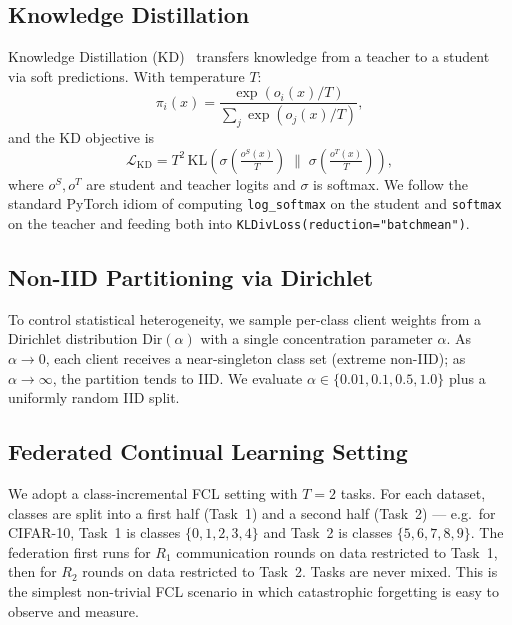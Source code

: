 \documentclass[journal]{IEEEtran}
\begin{document}
\subsection{Knowledge Distillation}

Knowledge Distillation (KD)~\cite{hinton_kd} transfers knowledge from a
teacher to a student via soft predictions. With temperature $T$:
\begin{equation}
    \pi_i(x) = \frac{\exp(o_i(x)/T)}{\sum_j \exp(o_j(x)/T)},
\end{equation}
and the KD objective is
\begin{equation}
    \mathcal{L}_{\textrm{KD}} = T^2\,
    \mathrm{KL}\!\left(\sigma\!\left(\tfrac{o^{S}(x)}{T}\right)\;\big\|\;
    \sigma\!\left(\tfrac{o^{T}(x)}{T}\right)\right),
\end{equation}
where $o^{S}, o^{T}$ are student and teacher logits and $\sigma$ is
softmax. We follow the standard PyTorch idiom of computing
\texttt{log\_softmax} on the student and \texttt{softmax} on the
teacher and feeding both into \texttt{KLDivLoss(reduction="batchmean")}.

\subsection{Non-IID Partitioning via Dirichlet}

To control statistical heterogeneity, we sample per-class client
weights from a Dirichlet distribution $\mathrm{Dir}(\alpha)$ with a
single concentration parameter $\alpha$. As $\alpha\!\to\!0$, each
client receives a near-singleton class set (extreme non-IID); as
$\alpha\!\to\!\infty$, the partition tends to IID. We evaluate
$\alpha\in\{0.01, 0.1, 0.5, 1.0\}$ plus a uniformly random IID split.

\subsection{Federated Continual Learning Setting}

We adopt a class-incremental FCL setting with $T{=}2$ tasks. For each
dataset, classes are split into a first half (Task~1) and a second
half (Task~2) --- e.g.\ for CIFAR-10, Task~1 is classes $\{0,1,2,3,4\}$
and Task~2 is classes $\{5,6,7,8,9\}$. The federation first runs for
$R_1$ communication rounds on data restricted to Task~1, then for
$R_2$ rounds on data restricted to Task~2. Tasks are never mixed.
This is the simplest non-trivial FCL scenario in which catastrophic
forgetting is easy to observe and measure.
\end{document}
